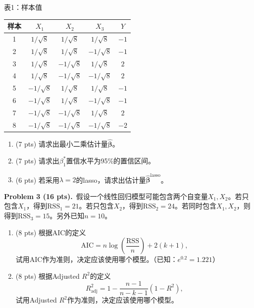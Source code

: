 \documentclass[UTF8,a4paper,11pt,fontset=fandol]{ctexart}
\newcommand{\problem}[2]{\par\addvspace{10pt}\Needspace{5\baselineskip}\textbf{Problem #1 (#2 pts).}\ }
\newcommand{\tabletitle}[1]{\par\smallskip\begin{center}#1\end{center}\vspace{-5pt}}
\begin{document}
\tabletitle{表1：样本值}
\begin{center}
\renewcommand{\arraystretch}{1.22}
\begin{tabular}{ccccc}
\toprule
样本 & $X_1$ & $X_2$ & $X_3$ & $Y$\\
\midrule
1 & $1/\sqrt8$  & $1/\sqrt8$  & $1/\sqrt8$  & $-1$\\
2 & $1/\sqrt8$  & $1/\sqrt8$  & $-1/\sqrt8$ & $-1$\\
3 & $1/\sqrt8$  & $-1/\sqrt8$ & $1/\sqrt8$  & $2$\\
4 & $1/\sqrt8$  & $-1/\sqrt8$ & $-1/\sqrt8$ & $2$\\
5 & $-1/\sqrt8$ & $1/\sqrt8$  & $1/\sqrt8$  & $-1$\\
6 & $-1/\sqrt8$ & $1/\sqrt8$  & $-1/\sqrt8$ & $-1$\\
7 & $-1/\sqrt8$ & $-1/\sqrt8$ & $1/\sqrt8$  & $2$\\
8 & $-1/\sqrt8$ & $-1/\sqrt8$ & $-1/\sqrt8$ & $-2$\\
\bottomrule
\end{tabular}
\end{center}
\begin{enumerate}
  \item (7 pts) 请求出最小二乘估计量$\widehat{\bm\beta}$。
  \item (7 pts) 请求出$\beta_1^*$置信水平为95\%的置信区间。
  \item (6 pts) 若采用$\lambda=2$的lasso，请求出估计量$\widehat{\bm\beta}^{\mathrm{lasso}}$。
\end{enumerate}

\problem{3}{16}假设一个线性回归模型可能包含两个自变量$X_1,X_2$。若只包含$X_1$，得到$\mathrm{RSS}_1=21$。若只包含$X_2$，得到$\mathrm{RSS}_2=24$。若同时包含$X_1,X_2$，则得到$\mathrm{RSS}_3=15$。另外已知$n=10$。
\begin{enumerate}
  \item (8 pts) 根据AIC的定义
  \begin{equation*}
    \mathrm{AIC}=n\log\left(\frac{\mathrm{RSS}}{n}\right)+2(k+1),
  \end{equation*}
  试用AIC作为准则，决定应该使用哪个模型。（已知：$e^{0.2}=1.221$）
  \item (8 pts) 根据Adjusted $R^2$的定义
  \begin{equation*}
    R_{\mathrm{adj}}^2=1-\frac{n-1}{n-k-1}(1-R^2),
  \end{equation*}
  试用Adjusted $R^2$作为准则，决定应该使用哪个模型。
\end{enumerate}
\end{document}
